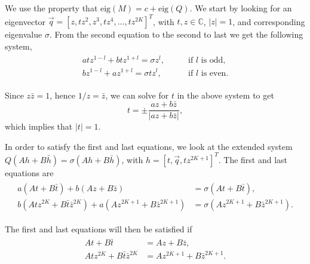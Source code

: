 \documentclass[a4paper,10pt]{article}
\begin{document}
We use the property that $\text{eig}(M) = c + \text{eig}(Q)$. We start by looking for an eigenvector $\vec{q} = [z,tz^2,z^3,tz^4,\hdots,tz^{2K}]^T$, with $t,z\in\mathbb{C}$, $|z|=1$, and corresponding eigenvalue $\sigma$. From the second equation to the second to last we get the following system,
% 
\begin{equation}
\label{eqn:eigen_Q}
\begin{split}
\begin{aligned}
  atz^{1-l}+btz^{1+l}=\sigma z^l,&\qquad \text{if  }l \text{  is odd},\\
  bz^{1-l}+az^{1+l}=\sigma tz^l,&\qquad \text{if  }l \text{  is even.}
\end{aligned}
\end{split}
\end{equation}
% 

Since $z\bar{z}=1$, hence $1/z = \bar{z}$, we can solve for $t$ in the above system to get
% 
\[
  t=\pm\frac{az+b\bar{z}}{|az+b\bar{z}|},
\]
% 
which implies that $|t|=1$.

In order to satisfy the first and last equations, we look at the extended system $Q(Ah+B\bar{h}) = \sigma (Ah+B\bar{h})$, with $h = [t,\vec{q},tz^{2K+1}]^T$. The first and last equations are
% 
\begin{equation}
\label{eqn:eigen_Q2}
\begin{split}
\begin{aligned}
  a(At+B\bar{t}) + b(Az+B\bar{z}) &= \sigma(At+B\bar{t}),\\
  b(Atz^{2K}+B\bar{t}\bar{z}^{2K}) + a(Az^{2K+1}+B\bar{z}^{2K+1}) &= \sigma(Az^{2K+1}+B\bar{z}^{2K+1}).
\end{aligned}
\end{split}
\end{equation}
% 

The first and last equations will then be satisfied if
% 
\begin{equation}
\label{eqn:eigen_Q3}
\begin{split}
\begin{aligned}
  At+B\bar{t} &= Az+B\bar{z},\\
  Atz^{2K}+B\bar{t}\bar{z}^{2K} &= Az^{2K+1}+B\bar{z}^{2K+1}.
\end{aligned}
\end{split}
\end{equation}
% 
\end{document}
